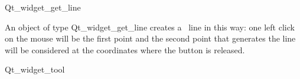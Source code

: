 
\begin{ccRefClass}{Qt_widget_get_line}

\ccDefinition
An object of type Qt\_widget\_get\_line creates a \cgal\ line in this way: one 
left click on the mouse will be the first point and the second point that 
generates the line will be considered at the coordinates where the button is 
released.

\ccInheritsFrom
Qt\_widget\_tool

\ccGlue

\ccCreation
{}


\end{ccRefClass}









